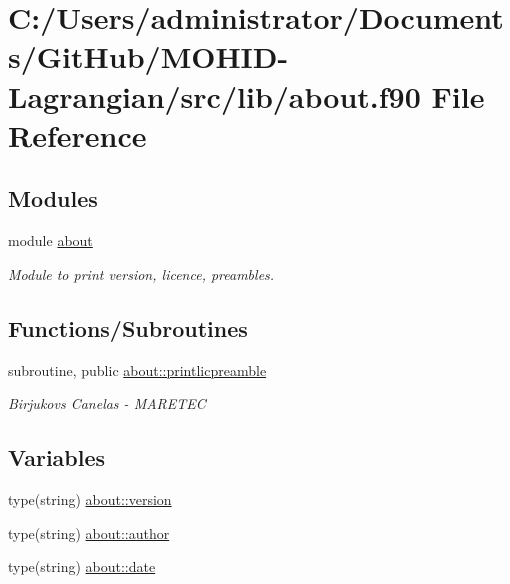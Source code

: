 \hypertarget{about_8f90}{}\section{C\+:/\+Users/administrator/\+Documents/\+Git\+Hub/\+M\+O\+H\+I\+D-\/\+Lagrangian/src/lib/about.f90 File Reference}
\label{about_8f90}
\subsection*{Modules}
\begin{DoxyCompactItemize}
\item 
module \hyperlink{namespaceabout}{about}
\begin{DoxyCompactList}\small\item\em Module to print version, licence, preambles. \end{DoxyCompactList}\end{DoxyCompactItemize}
\subsection*{Functions/\+Subroutines}
\begin{DoxyCompactItemize}
\item 
subroutine, public \hyperlink{namespaceabout_aca93132913ea2de3a9eb9aa3d1c0ec9c}{about\+::printlicpreamble}
\begin{DoxyCompactList}\small\item\em Birjukovs Canelas -\/ M\+A\+R\+E\+T\+EC \end{DoxyCompactList}\end{DoxyCompactItemize}
\subsection*{Variables}
\begin{DoxyCompactItemize}
\item 
type(string) \hyperlink{namespaceabout_a14ee014ae64ebcd65e04112f51ca7911}{about\+::version}
\item 
type(string) \hyperlink{namespaceabout_a157e082adf984f1d88804d2f8217a632}{about\+::author}
\item 
type(string) \hyperlink{namespaceabout_a24578effbdb161e41c0b52f50e7e3ffc}{about\+::date}
\end{DoxyCompactItemize}
